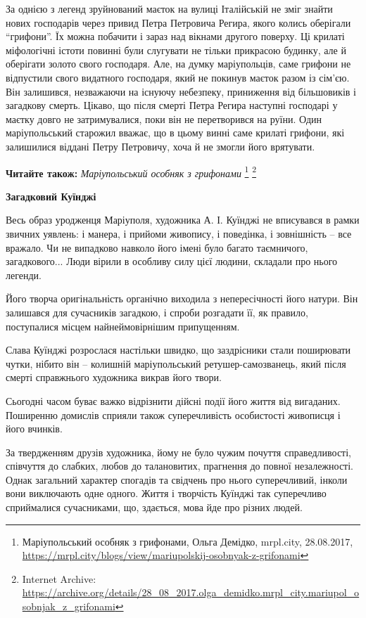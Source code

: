 За однією з легенд зруйнований маєток на вулиці Італійській не зміг знайти
нових господарів через привид Петра Петровича Регира, якого колись оберігали
\enquote{грифони}. Їх можна побачити і зараз над вікнами другого поверху. Ці крилаті
міфологічні істоти повинні були слугувати не тільки прикрасою будинку, але й
оберігати золото свого господаря. Але, на думку маріупольців, саме грифони не
відпустили свого видатного господаря, який не покинув маєток разом із сім’єю.
Він залишився, незважаючи на існуючу небезпеку, приниження від більшовиків і
загадкову смерть. Цікаво, що після смерті Петра Регира наступні господарі у
маєтку довго не затримувалися, поки він не перетворився на руїни. Один
маріупольський старожил вважає, що в цьому винні саме крилаті грифони, які
залишилися віддані Петру Петровичу, хоча й не змогли його врятувати.

\textbf{Читайте також:} \emph{Маріупольський особняк з грифонами}%
\footnote{Маріупольський особняк з грифонами, Ольга Демідко, mrpl.city, 28.08.2017, \url{https://mrpl.city/blogs/view/mariupolskij-osobnyak-z-grifonami} } %
\footnote{Internet Archive: \url{https://archive.org/details/28_08_2017.olga_demidko.mrpl_city.mariupol_osobnjak_z_grifonami}}

\begin{center}
\bfseries Загадковий Куїнджі	
\end{center}

Весь образ уродженця Маріуполя, художника А. І. Куїнджі не вписувався в рамки
звичних уявлень: і манера, і прийоми живопису, і поведінка, і зовнішність – все
вражало. Чи не випадково навколо його імені було багато таємничого,
загадкового... Люди вірили в особливу силу цієї людини, складали про нього
легенди.

Його творча оригінальність органічно виходила з непересічності його натури. Він
залишався для сучасників загадкою, і спроби розгадати її, як правило,
поступалися місцем найнеймовірнішим припущенням.

Слава Куїнджі розрослася настільки швидко, що заздрісники стали поширювати
чутки, нібито він – колишній маріупольський ретушер-самозванець, який після
смерті справжнього художника викрав його твори.

Сьогодні часом буває важко відрізнити дійсні події його життя від вигаданих.
Поширенню домислів сприяли також суперечливість особистості живописця і його
вчинків.

За твердженням друзів художника, йому не було чужим почуття справедливості,
співчуття до слабких, любов до талановитих, прагнення до повної незалежності.
Однак загальний характер спогадів та свідчень про нього суперечливий, інколи
вони виключають одне одного. Життя і творчість Куїнджі так суперечливо
сприймалися сучасниками, що, здається, мова йде про різних людей.

